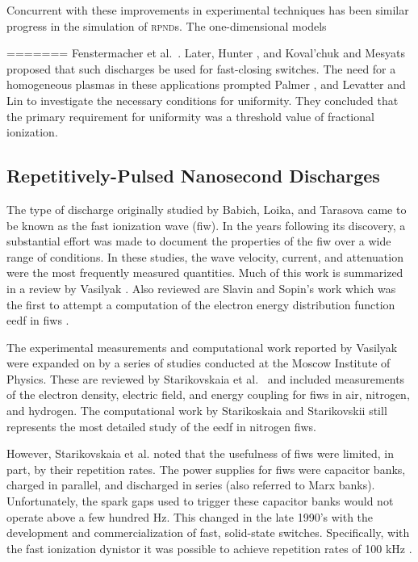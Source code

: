 Concurrent with these improvements in experimental techniques has been similar
progress in the simulation of \textsc{rpnd}s. The one-dimensional models 

=======
Fenstermacher et al.~\cite{Fenstermacher1972}. Later, Hunter \cite{Hunter1976},
and Koval'chuk and Mesyats \cite{Koval'chuk1976} proposed that such discharges
be used for fast-closing switches. The need for a homogeneous plasmas in these
applications prompted Palmer \cite{Palmer1974}, and Levatter and Lin
\cite{Levatter1980} to investigate the necessary conditions for uniformity. They
concluded that the primary requirement for uniformity was a threshold value of
fractional ionization.

\subsection{Repetitively-Pulsed Nanosecond Discharges}

The type of discharge originally studied by Babich, Loika, and Tarasova came to
be known as the fast ionization wave (\acs{fiw}). In the years following its
discovery, a substantial effort was made to document the properties of the
\acs{fiw} over a wide range of conditions. In these studies, the wave velocity,
current, and attenuation were the most frequently measured quantities. Much of
this work is summarized in a review by Vasilyak \cite{Vasilyak1994}. Also
reviewed are Slavin and Sopin's work which was the first to attempt a
computation of the electron energy distribution function \acs{eedf} in
\acs{fiw}s \cite{Slavin1992}.

The experimental measurements and computational work reported by Vasilyak were
expanded on by a series of studies conducted at the Moscow Institute of Physics.
These are reviewed by Starikovskaia et al.~\cite{Starikovskaia2001} and included
measurements of the electron density, electric field, and energy coupling for
\acs{fiw}s in air, nitrogen, and hydrogen. The computational work by
Starikoskaia and Starikovskii \cite{Starikovskaia2001a} still represents the
most detailed study of the \acs{eedf} in nitrogen \acs{fiw}s.

However, Starikovskaia et al. noted that the usefulness of \acs{fiw}s were
limited, in part, by their repetition rates. The power supplies for \acs{fiw}s
were capacitor banks, charged in parallel, and discharged in series (also
referred to Marx banks). Unfortunately, the spark gaps used to trigger these
capacitor banks would not operate above a few hundred Hz. This changed in the
late 1990's with the development and commercialization of fast, solid-state
switches. Specifically, with the fast ionization dynistor it was possible to
achieve repetition rates of 100 kHz \cite{Efanov1997}.

